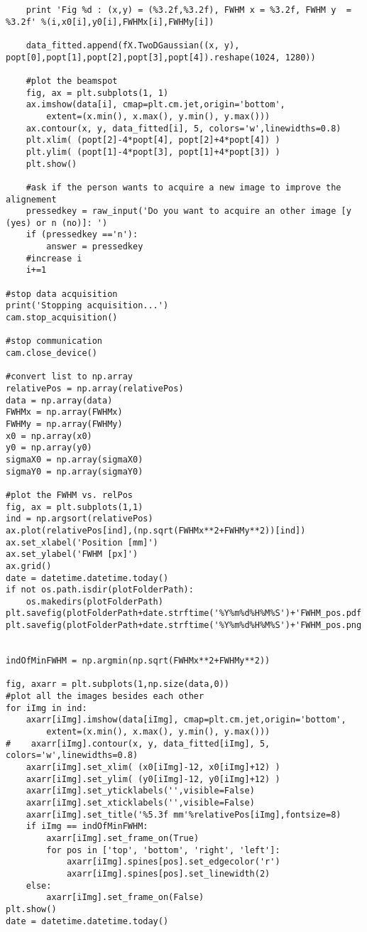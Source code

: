 \begin{lstlisting}
    print 'Fig %d : (x,y) = (%3.2f,%3.2f), FWHM x = %3.2f, FWHM y  = %3.2f' %(i,x0[i],y0[i],FWHMx[i],FWHMy[i])

    data_fitted.append(fX.TwoDGaussian((x, y), popt[0],popt[1],popt[2],popt[3],popt[4]).reshape(1024, 1280))

    #plot the beamspot
    fig, ax = plt.subplots(1, 1)
    ax.imshow(data[i], cmap=plt.cm.jet,origin='bottom',
        extent=(x.min(), x.max(), y.min(), y.max()))
    ax.contour(x, y, data_fitted[i], 5, colors='w',linewidths=0.8)
    plt.xlim( (popt[2]-4*popt[4], popt[2]+4*popt[4]) )
    plt.ylim( (popt[1]-4*popt[3], popt[1]+4*popt[3]) )
    plt.show()

    #ask if the person wants to acquire a new image to improve the alignement
    pressedkey = raw_input('Do you want to acquire an other image [y (yes) or n (no)]: ')
    if (pressedkey =='n'):
        answer = pressedkey
    #increase i
    i+=1

#stop data acquisition
print('Stopping acquisition...')
cam.stop_acquisition()

#stop communication
cam.close_device()

#convert list to np.array
relativePos = np.array(relativePos)
data = np.array(data)
FWHMx = np.array(FWHMx)
FWHMy = np.array(FWHMy)
x0 = np.array(x0)
y0 = np.array(y0)
sigmaX0 = np.array(sigmaX0)
sigmaY0 = np.array(sigmaY0)

#plot the FWHM vs. relPos
fig, ax = plt.subplots(1,1)
ind = np.argsort(relativePos)
ax.plot(relativePos[ind],(np.sqrt(FWHMx**2+FWHMy**2))[ind])
ax.set_xlabel('Position [mm]')
ax.set_ylabel('FWHM [px]')
ax.grid()
date = datetime.datetime.today()
if not os.path.isdir(plotFolderPath):
    os.makedirs(plotFolderPath)
plt.savefig(plotFolderPath+date.strftime('%Y%m%d%H%M%S')+'FWHM_pos.pdf')
plt.savefig(plotFolderPath+date.strftime('%Y%m%d%H%M%S')+'FWHM_pos.png')


indOfMinFWHM = np.argmin(np.sqrt(FWHMx**2+FWHMy**2))

fig, axarr = plt.subplots(1,np.size(data,0))
#plot all the images besides each other
for iImg in ind:
    axarr[iImg].imshow(data[iImg], cmap=plt.cm.jet,origin='bottom',
        extent=(x.min(), x.max(), y.min(), y.max()))
#    axarr[iImg].contour(x, y, data_fitted[iImg], 5, colors='w',linewidths=0.8)
    axarr[iImg].set_xlim( (x0[iImg]-12, x0[iImg]+12) )
    axarr[iImg].set_ylim( (y0[iImg]-12, y0[iImg]+12) )
    axarr[iImg].set_yticklabels('',visible=False)
    axarr[iImg].set_xticklabels('',visible=False)
    axarr[iImg].set_title('%5.3f mm'%relativePos[iImg],fontsize=8)
    if iImg == indOfMinFWHM:
        axarr[iImg].set_frame_on(True)
        for pos in ['top', 'bottom', 'right', 'left']:
            axarr[iImg].spines[pos].set_edgecolor('r')
            axarr[iImg].spines[pos].set_linewidth(2)
    else:
        axarr[iImg].set_frame_on(False)
plt.show()
date = datetime.datetime.today()


\end{lstlisting}
